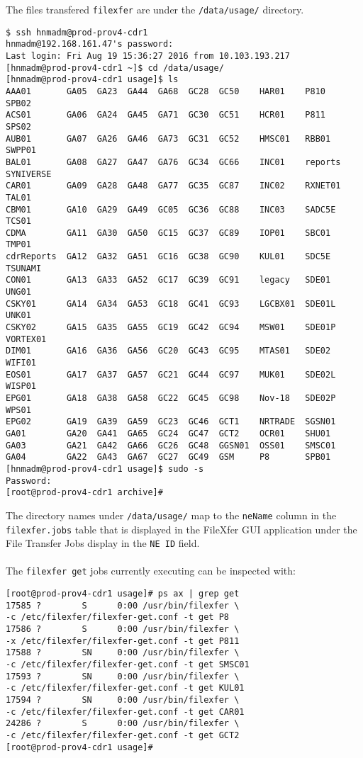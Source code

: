 \noindent The files transfered \texttt{filexfer} are under the
\texttt{/data/usage/} directory.

\begin{verbatim}
$ ssh hnmadm@prod-prov4-cdr1
hnmadm@192.168.161.47's password: 
Last login: Fri Aug 19 15:36:27 2016 from 10.103.193.217
[hnmadm@prod-prov4-cdr1 ~]$ cd /data/usage/
[hnmadm@prod-prov4-cdr1 usage]$ ls
AAA01       GA05  GA23  GA44  GA68  GC28  GC50    HAR01    P810     SPB02
ACS01       GA06  GA24  GA45  GA71  GC30  GC51    HCR01    P811     SPS02
AUB01       GA07  GA26  GA46  GA73  GC31  GC52    HMSC01   RBB01    SWPP01
BAL01       GA08  GA27  GA47  GA76  GC34  GC66    INC01    reports  SYNIVERSE
CAR01       GA09  GA28  GA48  GA77  GC35  GC87    INC02    RXNET01  TAL01
CBM01       GA10  GA29  GA49  GC05  GC36  GC88    INC03    SADC5E   TCS01
CDMA        GA11  GA30  GA50  GC15  GC37  GC89    IOP01    SBC01    TMP01
cdrReports  GA12  GA32  GA51  GC16  GC38  GC90    KUL01    SDC5E    TSUNAMI
CON01       GA13  GA33  GA52  GC17  GC39  GC91    legacy   SDE01    UNG01
CSKY01      GA14  GA34  GA53  GC18  GC41  GC93    LGCBX01  SDE01L   UNK01
CSKY02      GA15  GA35  GA55  GC19  GC42  GC94    MSW01    SDE01P   VORTEX01
DIM01       GA16  GA36  GA56  GC20  GC43  GC95    MTAS01   SDE02    WIFI01
EOS01       GA17  GA37  GA57  GC21  GC44  GC97    MUK01    SDE02L   WISP01
EPG01       GA18  GA38  GA58  GC22  GC45  GC98    Nov-18   SDE02P   WPS01
EPG02       GA19  GA39  GA59  GC23  GC46  GCT1    NRTRADE  SGSN01
GA01        GA20  GA41  GA65  GC24  GC47  GCT2    OCR01    SHU01
GA03        GA21  GA42  GA66  GC26  GC48  GGSN01  OSS01    SMSC01
GA04        GA22  GA43  GA67  GC27  GC49  GSM     P8       SPB01
[hnmadm@prod-prov4-cdr1 usage]$ sudo -s
Password:
[root@prod-prov4-cdr1 archive]#

\end{verbatim}

\noindent The directory names under \texttt{/data/usage/} map to the
\texttt{neName} column in the \texttt{filexfer.jobs} table that
is displayed in the FileXfer GUI application under the
File Transfer Jobs display in the \texttt{NE ID} field.\\
\\
The \texttt{filexfer get} jobs currently executing can be inspected with:

\begin{verbatim}
[root@prod-prov4-cdr1 usage]# ps ax | grep get
17585 ?        S      0:00 /usr/bin/filexfer \
-c /etc/filexfer/filexfer-get.conf -t get P8
17586 ?        S      0:00 /usr/bin/filexfer \
-x /etc/filexfer/filexfer-get.conf -t get P811
17588 ?        SN     0:00 /usr/bin/filexfer \
-c /etc/filexfer/filexfer-get.conf -t get SMSC01
17593 ?        SN     0:00 /usr/bin/filexfer \
-c /etc/filexfer/filexfer-get.conf -t get KUL01
17594 ?        SN     0:00 /usr/bin/filexfer \
-c /etc/filexfer/filexfer-get.conf -t get CAR01
24286 ?        S      0:00 /usr/bin/filexfer \
-c /etc/filexfer/filexfer-get.conf -t get GCT2
[root@prod-prov4-cdr1 usage]#
\end{verbatim}

